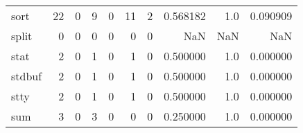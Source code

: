 \begin{tabular}{lrrrrrrrrr}
sort      &                                                 22 &                                                  0 &                                                  9 &                                                  0 &                                                 11 &                                                  2 &                                           0.568182 &                                    1.0 &                             0.090909 \\
split     &                                                  0 &                                                  0 &                                                  0 &                                                  0 &                                                  0 &                                                  0 &                                                NaN &                                    NaN &                                  NaN \\
stat      &                                                  2 &                                                  0 &                                                  1 &                                                  0 &                                                  1 &                                                  0 &                                           0.500000 &                                    1.0 &                             0.000000 \\
stdbuf    &                                                  2 &                                                  0 &                                                  1 &                                                  0 &                                                  1 &                                                  0 &                                           0.500000 &                                    1.0 &                             0.000000 \\
stty      &                                                  2 &                                                  0 &                                                  1 &                                                  0 &                                                  1 &                                                  0 &                                           0.500000 &                                    1.0 &                             0.000000 \\
sum       &                                                  3 &                                                  0 &                                                  3 &                                                  0 &                                                  0 &                                                  0 &                                           0.250000 &                                    1.0 &                             0.000000 \\

\end{tabular}
